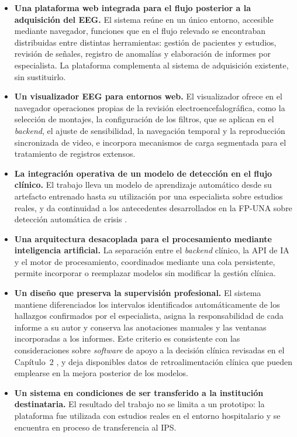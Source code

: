 \begin{itemize}
    \item \textbf{Una plataforma web integrada para el flujo posterior a la adquisición del EEG.}
    El sistema reúne en un único entorno, accesible mediante navegador, funciones que en el flujo relevado se encontraban distribuidas entre distintas herramientas: gestión de pacientes y estudios, revisión de señales, registro de anomalías y elaboración de informes por especialista.
    La plataforma complementa al sistema de adquisición existente, sin sustituirlo.

    \item \textbf{Un visualizador EEG para entornos web.}
    El visualizador ofrece en el navegador operaciones propias de la revisión electroencefalográfica, como la selección de montajes, la configuración de los filtros, que se aplican en el \textit{backend}, el ajuste de sensibilidad, la navegación temporal y la reproducción sincronizada de video, e incorpora mecanismos de carga segmentada para el tratamiento de registros extensos.

    \item \textbf{La integración operativa de un modelo de detección en el flujo clínico.}
    El trabajo lleva un modelo de aprendizaje automático desde su artefacto entrenado hasta su utilización por una especialista sobre estudios reales, y da continuidad a los antecedentes desarrollados en la FP-UNA sobre detección automática de crisis \citep{AyalaBritez2026SeizureDetection,Lezcano2026GradientBoosting}.

    \item \textbf{Una arquitectura desacoplada para el procesamiento mediante inteligencia artificial.}
    La separación entre el \textit{backend} clínico, la API de IA y el motor de procesamiento, coordinados mediante una cola persistente, permite incorporar o reemplazar modelos sin modificar la gestión clínica.

    \item \textbf{Un diseño que preserva la supervisión profesional.}
    El sistema mantiene diferenciados los intervalos identificados automáticamente de los hallazgos confirmados por el especialista, asigna la responsabilidad de cada informe a su autor y conserva las anotaciones manuales y las ventanas incorporadas a los informes.
    Este criterio es consistente con las consideraciones sobre \textit{software} de apoyo a la decisión clínica revisadas en el Capítulo~2 \citep{IMDRF2013SaMD,FDA2026CDS}, y deja disponibles datos de retroalimentación clínica que pueden emplearse en la mejora posterior de los modelos.

    \item \textbf{Un sistema en condiciones de ser transferido a la institución destinataria.}
    El resultado del trabajo no se limita a un prototipo: la plataforma fue utilizada con estudios reales en el entorno hospitalario y se encuentra en proceso de transferencia al IPS.
\end{itemize}


